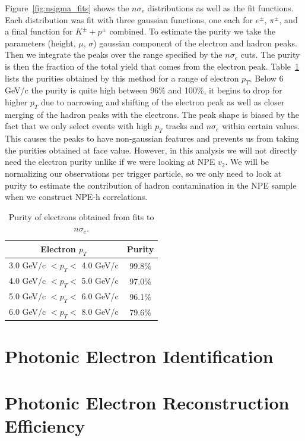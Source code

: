Figure~\ref{fig:nsigma_fits} shows the $n\sigma_e$ distributions as well as the fit functions. Each distribution was fit with three gaussian functions, one each for $e^{\pm}$, $\pi^{\pm}$, and a final function for $K^{\pm} + p^{\pm}$ combined. To estimate the purity we take the parameters (height, $\mu$, $\sigma$) gaussian component of the electron and hadron peaks. Then we integrate the peaks over the range specified by the $n\sigma_e$ cuts. The purity is then the fraction of the total yield that comes from the electron peak. Table~\ref{tab:purity} lists the purities obtained by this method for a range of electron $p_T$. Below 6 GeV/c the purity is quite high between 96\% and 100\%, it begins to drop for higher $p_T$ due to narrowing and shifting of the electron peak as well as closer merging of the hadron peaks with the electrons. The peak shape is biased by the fact that we only select events with high $p_T$ tracks and $n\sigma_e$ within certain values. This causes the peaks to have non-gaussian features and prevents us from taking the purities obtained at face value. However, in this analysis we will not directly need the electron purity unlike if we were looking at NPE $v_2$. We will be normalizing our observations per trigger particle, so we only need to look at purity to estimate the contribution of hadron contamination in the NPE sample when we construct NPE-h correlations.  

\begin{table}
\centering
\begin{tabular}{|c|c|}
\hline
Electron $p_T$         & Purity \\
\hline
3.0 GeV/c $< p_T <$ 4.0 GeV/c   & 99.8\% \\
\hline
4.0 GeV/c $< p_T <$ 5.0 GeV/c   & 97.0\% \\
\hline
5.0 GeV/c $< p_T <$ 6.0 GeV/c   & 96.1\% \\
\hline
6.0 GeV/c $< p_T <$ 8.0 GeV/c   & 79.6\% \\
\hline
\end{tabular}
\caption[Electron Purity]{Purity of electrons obtained from fits to $n\sigma_e$.}
\label{tab:purity}
\end{table}

\section{Photonic Electron Identification}

\section{Photonic Electron Reconstruction Efficiency}
